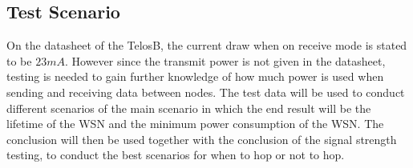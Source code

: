 \subsection{Test Scenario}
On the datasheet of the TelosB, the current draw when on receive mode is stated to be $23mA$. However since the transmit power is not given in the datasheet, testing is needed to gain further knowledge of how much power is used when sending and receiving data between nodes. The test data will be used to conduct different scenarios of the main scenario in which the end result will be the lifetime of the WSN and the minimum power consumption of the WSN. The conclusion will then be used together with the conclusion of the signal strength testing, to conduct the best scenarios for when to hop or not to hop.